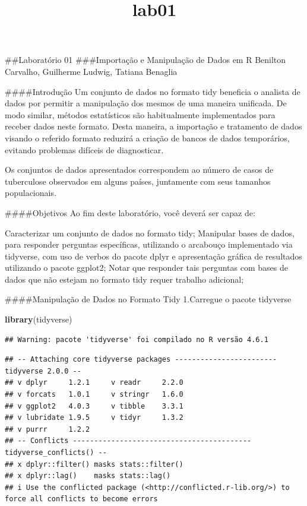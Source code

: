 \documentclass[
]{article}
\title{lab01}
\author{}
\date{\vspace{-2.5em}}
\newenvironment{Shaded}{\begin{snugshade}}{\end{snugshade}}
\newcommand{\FunctionTok}[1]{\textcolor[rgb]{0.13,0.29,0.53}{\textbf{#1}}}
\newcommand{\NormalTok}[1]{#1}
\begin{document}
\maketitle

\#\#Laboratório 01 \#\#\#Importação e Manipulação de Dados em R Benilton
Carvalho, Guilherme Ludwig, Tatiana Benaglia

\#\#\#\#Introdução Um conjunto de dados no formato tidy beneficia o
analista de dados por permitir a manipulação dos mesmos de uma maneira
unificada. De modo similar, métodos estatísticos são habitualmente
implementados para receber dados neste formato. Desta maneira, a
importação e tratamento de dados visando o referido formato reduzirá a
criação de bancos de dados temporários, evitando problemas difíceis de
diagnosticar.

Os conjuntos de dados apresentados correspondem ao número de casos de
tuberculose observados em alguns países, juntamente com seus tamanhos
populacionais.

\#\#\#\#Objetivos Ao fim deste laboratório, você deverá ser capaz de:

Caracterizar um conjunto de dados no formato tidy; Manipular bases de
dados, para responder perguntas específicas, utilizando o arcabouço
implementado via tidyverse, com uso de verbos do pacote dplyr e
apresentação gráfica de resultados utilizando o pacote ggplot2; Notar
que responder tais perguntas com bases de dados que não estejam no
formato tidy requer trabalho adicional;

\#\#\#\#Manipulação de Dados no Formato Tidy 1.Carregue o pacote
tidyverse

\begin{Shaded}
\begin{Highlighting}[]
\FunctionTok{library}\NormalTok{(tidyverse)}
\end{Highlighting}
\end{Shaded}

\begin{verbatim}
## Warning: pacote 'tidyverse' foi compilado no R versão 4.6.1
\end{verbatim}

\begin{verbatim}
## -- Attaching core tidyverse packages ------------------------ tidyverse 2.0.0 --
## v dplyr     1.2.1     v readr     2.2.0
## v forcats   1.0.1     v stringr   1.6.0
## v ggplot2   4.0.3     v tibble    3.3.1
## v lubridate 1.9.5     v tidyr     1.3.2
## v purrr     1.2.2     
## -- Conflicts ------------------------------------------ tidyverse_conflicts() --
## x dplyr::filter() masks stats::filter()
## x dplyr::lag()    masks stats::lag()
## i Use the conflicted package (<http://conflicted.r-lib.org/>) to force all conflicts to become errors
\end{verbatim}
\end{document}
